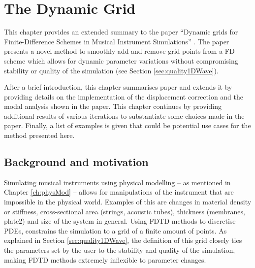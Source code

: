 \chapter{The Dynamic Grid}\label{ch:dynamicGrid}
This chapter provides an extended summary to the paper ``Dynamic grids for Finite-Difference Schemes in Musical Instrument Simulations'' \citeP[G]. The paper presents a novel method to smoothly add and remove grid points from a FD scheme which allows for dynamic parameter variations without compromising stability or quality of the simulation (see Section \ref{sec:quality1DWave}). 

After a brief introduction, this chapter summarises paper \citeP[G] and extends it by providing details on the implementation of the displacement correction and the modal analysis shown in the paper. This chapter continues by providing additional results of various iterations to substantiate some choices made in the paper. Finally, a list of examples is given that could be potential use cases for the method presented here. 

\section{Background and motivation}
Simulating musical instruments using physical modelling -- as mentioned in Chapter \ref{ch:physMod} -- allows for manipulations of the instrument that are impossible in the physical world. Examples of this are changes in material density or stiffness, cross-sectional area (strings, acoustic tubes), thickness (membranes, plate2) and size of the system in general. Using FDTD methods to discretise PDEs, constrains the simulation to a grid of a finite amount of points. As explained in Section \ref{sec:quality1DWave}, the definition of this grid closely ties the parameters set by the user to the stability and quality of the simulation, making FDTD methods extremely inflexible to parameter changes. 


